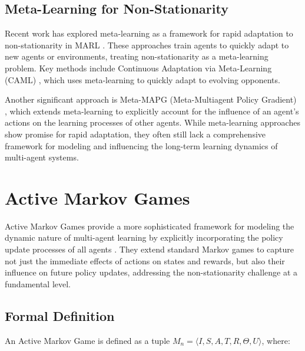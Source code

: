 \documentclass[a4paper,12pt]{report}
\begin{document}
\subsection{Meta-Learning for Non-Stationarity}
Recent work has explored meta-learning as a framework for rapid adaptation to non-stationarity in MARL \cite{alshedivat2018continuous, kim2021policy}. These approaches train agents to quickly adapt to new agents or environments, treating non-stationarity as a meta-learning problem. Key methods include Continuous Adaptation via Meta-Learning (CAML) \cite{alshedivat2018continuous}, which uses meta-learning to quickly adapt to evolving opponents.

Another significant approach is Meta-MAPG (Meta-Multiagent Policy Gradient) \cite{kim2021policy}, which extends meta-learning to explicitly account for the influence of an agent's actions on the learning processes of other agents. While meta-learning approaches show promise for rapid adaptation, they often still lack a comprehensive framework for modeling and influencing the long-term learning dynamics of multi-agent systems.

\section{Active Markov Games}

Active Markov Games provide a more sophisticated framework for modeling the dynamic nature of multi-agent learning by explicitly incorporating the policy update processes of all agents \cite{kim2022influencing}. They extend standard Markov games to capture not just the immediate effects of actions on states and rewards, but also their influence on future policy updates, addressing the non-stationarity challenge at a fundamental level.

\subsection{Formal Definition}

An Active Markov Game is defined as a tuple $M_n = \langle I, S, A, T, R, \Theta, U \rangle$, where:
\end{document}
